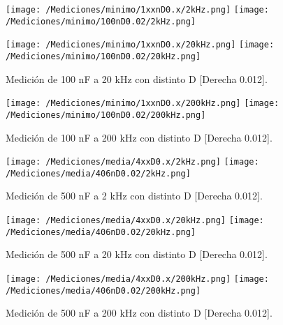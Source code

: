 \begin{figure}[H]
	\centering
	\texttt{[image: /Mediciones/minimo/1xxnD0.x/2kHz.png]}
	\texttt{[image: /Mediciones/minimo/100nD0.02/2kHz.png]}
	\label{fig:fcon}
\end{figure}
\begin{figure}[H]
	\centering
	\texttt{[image: /Mediciones/minimo/1xxnD0.x/20kHz.png]}
	\texttt{[image: /Mediciones/minimo/100nD0.02/20kHz.png]}
\caption{Medición de 100 nF a 20 kHz con distinto D [Derecha 0.012].}
	\label{fig:fcon}
\end{figure}
\begin{figure}[H]
	\centering
	\texttt{[image: /Mediciones/minimo/1xxnD0.x/200kHz.png]}
	\texttt{[image: /Mediciones/minimo/100nD0.02/200kHz.png]}
\caption{Medición de 100 nF a 200 kHz con distinto D [Derecha 0.012].}
	\label{fig:fcon}
\end{figure}
\begin{figure}[H]
	\centering
	\texttt{[image: /Mediciones/media/4xxD0.x/2kHz.png]}
	\texttt{[image: /Mediciones/media/406nD0.02/2kHz.png]}
\caption{Medición de 500 nF a 2 kHz con distinto D [Derecha 0.012].}
	\label{fig:fcon}
\end{figure}
\begin{figure}[H]
	\centering
	\texttt{[image: /Mediciones/media/4xxD0.x/20kHz.png]}
	\texttt{[image: /Mediciones/media/406nD0.02/20kHz.png]}
\caption{Medición de 500 nF a 20 kHz con distinto D [Derecha 0.012].}
	\label{fig:fcon}
\end{figure}
\begin{figure}[H]
	\centering
	\texttt{[image: /Mediciones/media/4xxD0.x/200kHz.png]}
	\texttt{[image: /Mediciones/media/406nD0.02/200kHz.png]}
\caption{Medición de 500 nF a 200 kHz con distinto D [Derecha 0.012].}
	\label{fig:fcon}
\end{figure}
